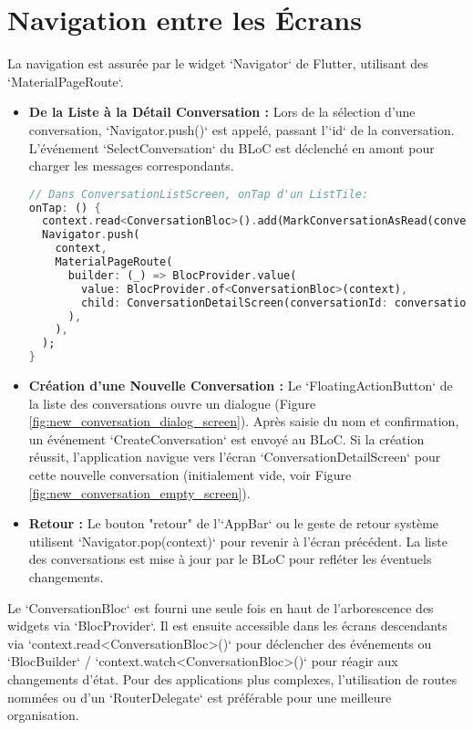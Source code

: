 \documentclass[12pt,a4paper]{article}
\begin{document}
\section{Navigation entre les Écrans}
La navigation est assurée par le widget `Navigator` de Flutter, utilisant des `MaterialPageRoute`.
\begin{itemize}
    \item \textbf{De la Liste à la Détail Conversation :} Lors de la sélection d'une conversation, `Navigator.push()` est appelé, passant l'`id` de la conversation. L'événement `SelectConversation` du BLoC est déclenché en amont pour charger les messages correspondants.
    \begin{lstlisting}[language=Dart, caption=Navigation vers l'écran de détail, style=dartstyle]
// Dans ConversationListScreen, onTap d'un ListTile:
onTap: () {
  context.read<ConversationBloc>().add(MarkConversationAsRead(conversationId: conversation.id));
  Navigator.push(
    context,
    MaterialPageRoute(
      builder: (_) => BlocProvider.value(
        value: BlocProvider.of<ConversationBloc>(context),
        child: ConversationDetailScreen(conversationId: conversation.id),
      ),
    ),
  );
}
\end{lstlisting}
    \item \textbf{Création d'une Nouvelle Conversation :} Le `FloatingActionButton` de la liste des conversations ouvre un dialogue (Figure \ref{fig:new_conversation_dialog_screen}). Après saisie du nom et confirmation, un événement `CreateConversation` est envoyé au BLoC. Si la création réussit, l'application navigue vers l'écran `ConversationDetailScreen` pour cette nouvelle conversation (initialement vide, voir Figure \ref{fig:new_conversation_empty_screen}).


    \item \textbf{Retour :} Le bouton "retour" de l'`AppBar` ou le geste de retour système utilisent `Navigator.pop(context)` pour revenir à l'écran précédent. La liste des conversations est mise à jour par le BLoC pour refléter les éventuels changements.
\end{itemize}

\begin{infobox}[title=Gestion des Routes et Accès au BLoC]
Le `ConversationBloc` est fourni une seule fois en haut de l'arborescence des widgets via `BlocProvider`. Il est ensuite accessible dans les écrans descendants via `context.read<ConversationBloc>()` pour déclencher des événements ou `BlocBuilder` / `context.watch<ConversationBloc>()` pour réagir aux changements d'état. Pour des applications plus complexes, l'utilisation de routes nommées ou d'un `RouterDelegate` est préférable pour une meilleure organisation.
\end{infobox}
\end{document}
